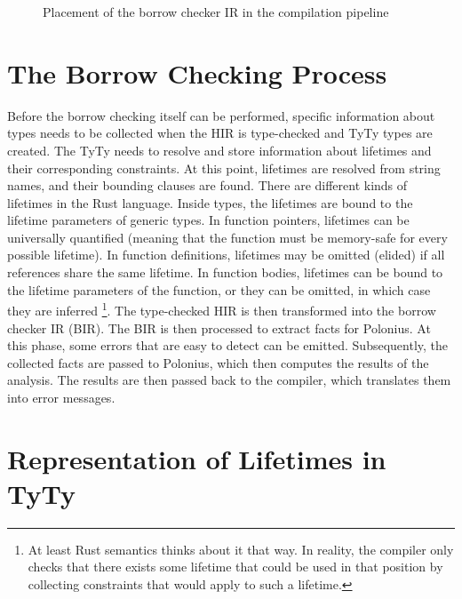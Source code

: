\documentclass[
  11pt,
  twoside,symmetric]{report}
\begin{document}
\begin{figure}
\centering

\caption{Placement of the borrow checker IR in the compilation pipeline}
\end{figure}

\section{The Borrow Checking
Process}\label{sec:the-borrow-checking-process}

Before the borrow checking itself can be performed, specific information
about types needs to be collected when the HIR is type-checked and TyTy
types are created. The TyTy needs to resolve and store information about
lifetimes and their corresponding constraints. At this point, lifetimes
are resolved from string names, and their bounding clauses are found.
There are different kinds of lifetimes in the Rust language. Inside
types, the lifetimes are bound to the lifetime parameters of generic
types. In function pointers, lifetimes can be universally quantified
(meaning that the function must be memory-safe for every possible
lifetime). In function definitions, lifetimes may be omitted (elided) if
all references share the same lifetime. In function bodies, lifetimes
can be bound to the lifetime parameters of the function, or they can be
omitted, in which case they are inferred \footnote{At least Rust
  semantics thinks about it that way. In reality, the compiler only
  checks that there exists some lifetime that could be used in that
  position by collecting constraints that would apply to such a
  lifetime.}. The type-checked HIR is then transformed into the borrow
checker IR (BIR). The BIR is then processed to extract facts for
Polonius. At this phase, some errors that are easy to detect can be
emitted. Subsequently, the collected facts are passed to Polonius, which
then computes the results of the analysis. The results are then passed
back to the compiler, which translates them into error messages.

\section{Representation of Lifetimes in
TyTy}\label{sec:representation-of-lifetimes-in-tyty}
\end{document}
